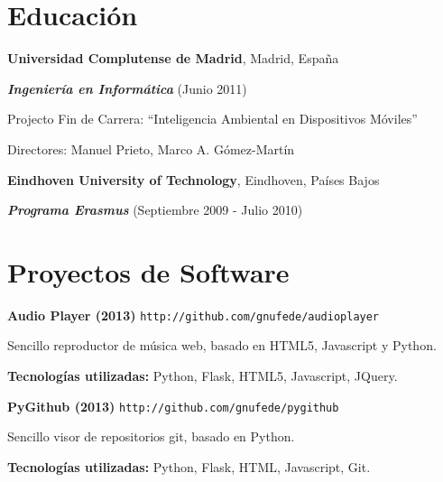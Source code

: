 \documentclass[margin,line]{resume}
\begin{document}
\begin{resume}
\section{\sc Educación}
{\bf Universidad Complutense de Madrid}, Madrid, España\\
\vspace*{-.1in}
\begin{list1}
\item[] {\bf \em Ingeniería en Informática }(Junio 2011) 
\begin{list2}
\vspace*{.05in}
\item Projecto Fin de Carrera:  ``Inteligencia Ambiental en Dispositivos Móviles'' 
\item Directores:  Manuel Prieto, Marco A. Gómez-Martín
\end{list2}
\end{list1}


{\bf Eindhoven University of Technology}, Eindhoven, Países Bajos\\
\vspace*{-.1in}
\begin{list1}
\item[] {\bf \em Programa Erasmus} (Septiembre 2009 - Julio 2010) 
\end{list1}

\newpage
\section{\sc Proyectos de Software } 
\begin{list1}
\item[] {\bf Audio Player (2013)}
 { \tt http://github.com/gnufede/audioplayer}

Sencillo reproductor de música web, basado en HTML5, Javascript y Python.
\vspace*{.03in}
\begin{list2}
\item {\bf Tecnologías utilizadas:} Python, Flask, HTML5, Javascript, JQuery.
\end{list2}

\vspace*{.09in}
\item[] {\bf PyGithub (2013)}
 { \tt http://github.com/gnufede/pygithub}

Sencillo visor de repositorios git, basado en Python.
\vspace*{.03in}
\begin{list2}
\item {\bf Tecnologías utilizadas:} Python, Flask, HTML, Javascript, Git.
\end{list2}


\end{list1}
\end{resume}
\end{document}

